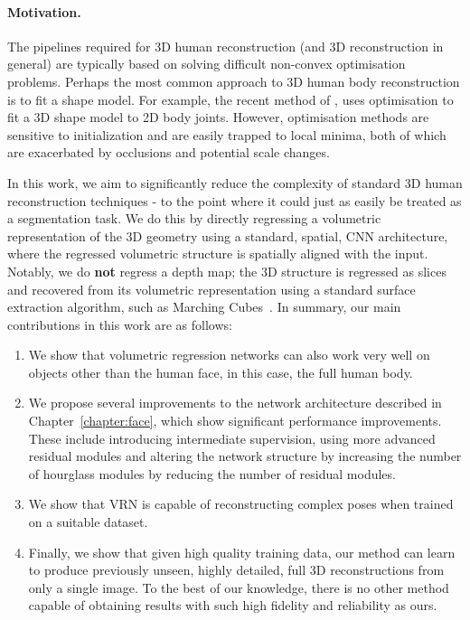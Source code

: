 \paragraph{Motivation.} The pipelines required for 3D human
reconstruction (and 3D reconstruction in general) are typically based
on solving difficult non-convex optimisation problems. Perhaps the
most common approach to 3D human body reconstruction is to fit a shape
model. For example, the recent method of \cite{bogo2016smplify}, uses
optimisation to fit a 3D shape model to 2D body joints. However,
optimisation methods are sensitive to initialization and are easily
trapped to local minima, both of which are exacerbated by occlusions
and potential scale changes.

In this work, we aim to significantly reduce the complexity of
standard 3D human reconstruction techniques - to the point where it
could just as easily be treated as a segmentation task. We do this by
directly regressing a volumetric representation of the 3D geometry
using a standard, spatial, CNN architecture, where the regressed
volumetric structure is spatially aligned with the input. Notably, we
do \textbf{not} regress a depth map; the 3D structure is regressed as
slices and recovered from its volumetric representation using a
standard surface extraction algorithm, such as Marching
Cubes~\cite{lorensen1987marching}. In summary, our main contributions
in this work are as follows:

\begin{enumerate}
\item We show that volumetric regression networks can also work very
  well on objects other than the human face, in this case, the full
  human body.

\item We propose several improvements to the network architecture
  described in Chapter~\ref{chapter:face}, which show significant
  performance improvements. These include introducing intermediate
  supervision, using more advanced residual modules and altering the
  network structure by increasing the number of hourglass modules by
  reducing the number of residual modules.

\item We show that VRN is capable of reconstructing complex poses when
  trained on a suitable dataset.

\item Finally, we show that given high quality training data, our
  method can learn to produce previously unseen, highly detailed, full
  3D reconstructions from only a single image. To the best of our
  knowledge, there is no other method capable of obtaining results
  with such high fidelity and reliability as ours.
\end{enumerate}

